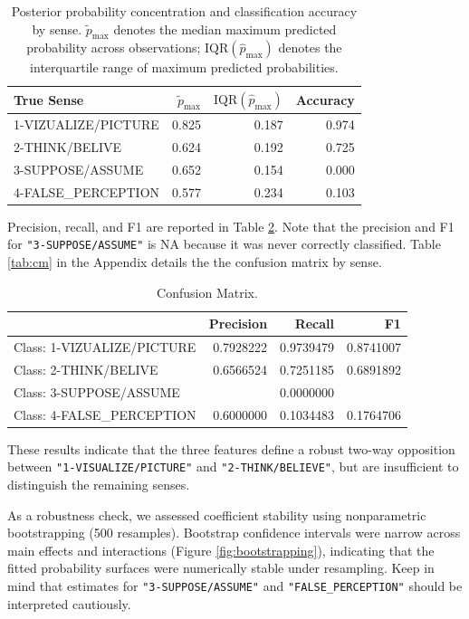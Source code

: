 \documentclass[
]{article}
\begin{document}
\begin{table}[H]
\centering
\caption{\label{tab:unnamed-chunk-7}Posterior probability concentration and classification accuracy by sense. $\tilde{p}_{\max}$ denotes the median maximum predicted probability across observations; $\text{IQR}(\hat{p}_{\max})$ denotes the interquartile range of maximum predicted probabilities.\label{tab:senseAccuracy}}
\centering
\begin{tabular}[t]{lrrr}
\toprule
True Sense & $\tilde{p}_{\max}$ & $\text{IQR}(\hat{p}_{\max})$ & Accuracy\\
\midrule
1-VIZUALIZE/PICTURE & 0.825 & 0.187 & 0.974\\
2-THINK/BELIVE & 0.624 & 0.192 & 0.725\\
3-SUPPOSE/ASSUME & 0.652 & 0.154 & 0.000\\
4-FALSE\_PERCEPTION & 0.577 & 0.234 & 0.103\\
\bottomrule
\end{tabular}
\end{table}

Precision, recall, and F1 are reported in Table \ref{tab:cmDetail}. Note
that the precision and F1 for \texttt{"3-SUPPOSE/ASSUME"} is NA because
it was never correctly classified. Table \ref{tab:cm} in the Appendix
details the the confusion matrix by sense.

\begin{table}[H]
\centering
\caption{\label{tab:unnamed-chunk-8}Confusion Matrix.\label{tab:cmDetail}}
\centering
\begin{tabular}[t]{lrrr}
\toprule
  & Precision & Recall & F1\\
\midrule
Class: 1-VIZUALIZE/PICTURE & 0.7928222 & 0.9739479 & 0.8741007\\
Class: 2-THINK/BELIVE & 0.6566524 & 0.7251185 & 0.6891892\\
Class: 3-SUPPOSE/ASSUME &  & 0.0000000 & \\
Class: 4-FALSE\_PERCEPTION & 0.6000000 & 0.1034483 & 0.1764706\\
\bottomrule
\end{tabular}
\end{table}

These results indicate that the three features define a robust two-way
opposition between \texttt{"1-VISUALIZE/PICTURE"} and
\texttt{"2-THINK/BELIEVE"}, but are insufficient to distinguish the
remaining senses.

As a robustness check, we assessed coefficient stability using
nonparametric bootstrapping (500 resamples). Bootstrap confidence
intervals were narrow across main effects and interactions (Figure
\ref{fig:bootstrapping}), indicating that the fitted probability
surfaces were numerically stable under resampling. Keep in mind that
estimates for \texttt{"3-SUPPOSE/ASSUME"} and
\texttt{"FALSE\_PERCEPTION"} should be interpreted cautiously.
\end{document}
